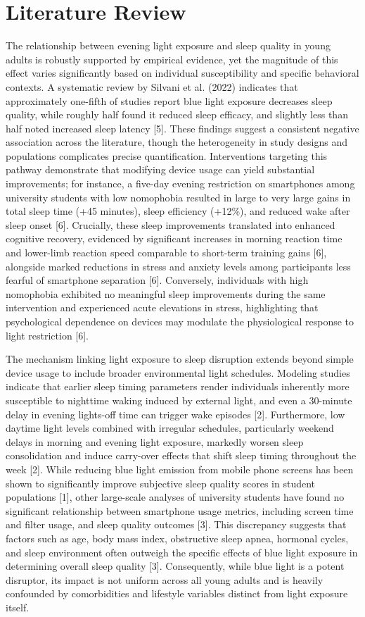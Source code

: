 \documentclass[conference]{IEEEtran}
\begin{document}
\section{Literature Review}
The relationship between evening light exposure and sleep quality in young adults is robustly supported by empirical evidence, yet the magnitude of this effect varies significantly based on individual susceptibility and specific behavioral contexts. A systematic review by Silvani et al. (2022) indicates that approximately one-fifth of studies report blue light exposure decreases sleep quality, while roughly half found it reduced sleep efficacy, and slightly less than half noted increased sleep latency [5]. These findings suggest a consistent negative association across the literature, though the heterogeneity in study designs and populations complicates precise quantification. Interventions targeting this pathway demonstrate that modifying device usage can yield substantial improvements; for instance, a five-day evening restriction on smartphones among university students with low nomophobia resulted in large to very large gains in total sleep time (+45 minutes), sleep efficiency (+12\%), and reduced wake after sleep onset [6]. Crucially, these sleep improvements translated into enhanced cognitive recovery, evidenced by significant increases in morning reaction time and lower-limb reaction speed comparable to short-term training gains [6], alongside marked reductions in stress and anxiety levels among participants less fearful of smartphone separation [6]. Conversely, individuals with high nomophobia exhibited no meaningful sleep improvements during the same intervention and experienced acute elevations in stress, highlighting that psychological dependence on devices may modulate the physiological response to light restriction [6].

The mechanism linking light exposure to sleep disruption extends beyond simple device usage to include broader environmental light schedules. Modeling studies indicate that earlier sleep timing parameters render individuals inherently more susceptible to nighttime waking induced by external light, and even a 30-minute delay in evening lights-off time can trigger wake episodes [2]. Furthermore, low daytime light levels combined with irregular schedules, particularly weekend delays in morning and evening light exposure, markedly worsen sleep consolidation and induce carry-over effects that shift sleep timing throughout the week [2]. While reducing blue light emission from mobile phone screens has been shown to significantly improve subjective sleep quality scores in student populations [1], other large-scale analyses of university students have found no significant relationship between smartphone usage metrics, including screen time and filter usage, and sleep quality outcomes [3]. This discrepancy suggests that factors such as age, body mass index, obstructive sleep apnea, hormonal cycles, and sleep environment often outweigh the specific effects of blue light exposure in determining overall sleep quality [3]. Consequently, while blue light is a potent disruptor, its impact is not uniform across all young adults and is heavily confounded by comorbidities and lifestyle variables distinct from light exposure itself.
\end{document}
